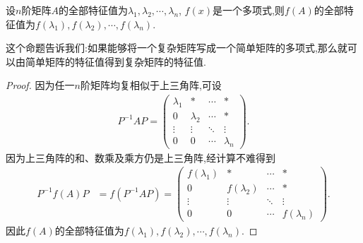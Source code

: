 \documentclass[lang=cn,newtx,10pt,scheme=chinese]{elegantbook}
\begin{document}
\begin{proposition}\label{proposition:矩阵多项式的特征值就是原特征值代入多项式得到的数}
设$n$阶矩阵$A$的全部特征值为$\lambda_1, \lambda_2, \cdots, \lambda_n$, $f(x)$是一个多项式,则$f(A)$的全部特征值为$f(\lambda_1), f(\lambda_2), \cdots, f(\lambda_n)$.
\end{proposition}
\begin{remark}
这个命题告诉我们:如果能够将一个复杂矩阵写成一个简单矩阵的多项式,那么就可以由简单矩阵的特征值得到复杂矩阵的特征值.
\end{remark}
\begin{proof}
因为任一$n$阶矩阵均复相似于上三角阵,可设
\begin{align*}
P^{-1}AP = \begin{pmatrix}
\lambda_1 & * & \cdots & * \\
0 & \lambda_2 & \cdots & * \\
\vdots & \vdots & \ddots & \vdots \\
0 & 0 & \cdots & \lambda_n
\end{pmatrix}.
\end{align*}
因为上三角阵的和、数乘及乘方仍是上三角阵,经计算不难得到
\begin{align*}
P^{-1}f(A)P &= f(P^{-1}AP) = \begin{pmatrix}
f(\lambda_1) & * & \cdots & * \\
0 & f(\lambda_2) & \cdots & * \\
\vdots & \vdots & \ddots & \vdots \\
0 & 0 & \cdots & f(\lambda_n)
\end{pmatrix}.
\end{align*}
因此$f(A)$的全部特征值为$f(\lambda_1), f(\lambda_2), \cdots, f(\lambda_n)$.
\end{proof}
\end{document}
